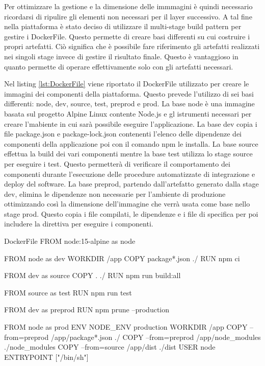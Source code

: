 Per ottimizzare la gestione e la dimensione delle immmagini è quindi necessario ricordarsi di ripulire gli
elementi non necessari per il layer successivo. A tal fine nella piattaforma è stato deciso di
utilizzare il multi-stage build pattern per gestire i DockerFile. Questo permette di creare basi
differenti su cui costruire i propri artefatti. Ciò significa che è possibile
fare riferimento gli artefatti realizzati nei singoli stage invece di gestire il risultato finale.
Questo è vantaggioso in quanto permette di operare effettivamente solo con gli artefatti necessari.

Nel listing \ref{lst:DockerFile} viene riportato il DockerFile utilizzato per creare le immagini dei componenti della piattaforma.
Questo prevede l'utilizzo di sei basi differenti: node, dev, source, test, preprod e prod.
La base node è una immagine basata sul progetto Alpine Linux contente Node.js e gl istrumenti necessari per
creare l'mabiente in cui sarà possibile eseguire l'applicazione. La base dev copia i file package.json e package-lock.json
contenenti l'elenco delle dipendenze dei componenti della applicazione poi con il comando npm le installa.
La base source effettua la build dei vari componenti mentre la base test utilizza lo stage source per eseguire i test.
Questo permetterà di verificare il comportamento dei componenti durante l'esecuzione delle procedure automatizzate di integrazione
e deploy del software. La base preprod, partendo dall'artefatto generato dalla stage dev, elimina le dipendenze non necessarie per l'ambiente
di produzione ottimizzando così la dimensione dell'immagine che verrà usata come base nello stage prod.
Questo copia i file compilati, le dipendenze e i file di specifica per poi includere la direttiva per eseguire i componenti.

\begin{docker}[label={lst:DockerFile}]{DockerFile}
    FROM node:15-alpine as node

    FROM node as dev
    WORKDIR /app
    COPY package*.json ./
    RUN npm ci

    FROM dev as source
    COPY . ./
    RUN npm run build:all

    FROM source as test
    RUN npm run test

    FROM dev as preprod
    RUN npm prune --production

    FROM node as prod
    ENV NODE_ENV production
    WORKDIR /app
    COPY --from=preprod /app/package*.json ./
    COPY --from=preprod /app/node_modules ./node_modules
    COPY --from=source /app/dist ./dist
    USER node
    ENTRYPOINT ["/bin/sh"]

\end{docker}

